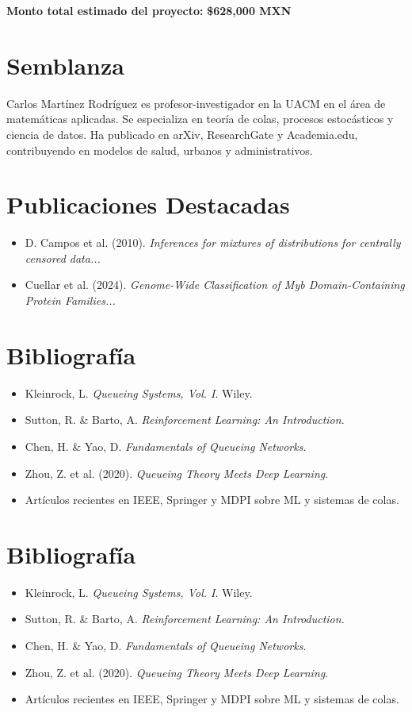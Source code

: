 \documentclass[12pt]{article}
\begin{document}
\noindent\textbf{Monto total estimado del proyecto:} \textbf{\$628,000 MXN}

\section{Semblanza}
Carlos Martínez Rodríguez es profesor-investigador en la UACM en el área de matemáticas aplicadas. Se especializa en teoría de colas, procesos estocásticos y ciencia de datos. Ha publicado en arXiv, ResearchGate y Academia.edu, contribuyendo en modelos de salud, urbanos y administrativos.

\section{Publicaciones Destacadas}
\begin{itemize}
  \item D. Campos et al. (2010). \textit{Inferences for mixtures of distributions for centrally censored data...}
  \item Cuellar et al. (2024). \textit{Genome-Wide Classification of Myb Domain-Containing Protein Families...}
\end{itemize}

\section{Bibliografía}
\begin{itemize}
  \item Kleinrock, L. \textit{Queueing Systems, Vol. I}. Wiley.
  \item Sutton, R. \& Barto, A. \textit{Reinforcement Learning: An Introduction}.
  \item Chen, H. \& Yao, D. \textit{Fundamentals of Queueing Networks}.
  \item Zhou, Z. et al. (2020). \textit{Queueing Theory Meets Deep Learning}.
  \item Artículos recientes en IEEE, Springer y MDPI sobre ML y sistemas de colas.
\end{itemize}


\section{Bibliografía}
\begin{itemize}
  \item Kleinrock, L. \textit{Queueing Systems, Vol. I}. Wiley.
  \item Sutton, R. \& Barto, A. \textit{Reinforcement Learning: An Introduction}.
  \item Chen, H. \& Yao, D. \textit{Fundamentals of Queueing Networks}.
  \item Zhou, Z. et al. (2020). \textit{Queueing Theory Meets Deep Learning}.
  \item Artículos recientes en IEEE, Springer y MDPI sobre ML y sistemas de colas.
\end{itemize}
\end{document}
